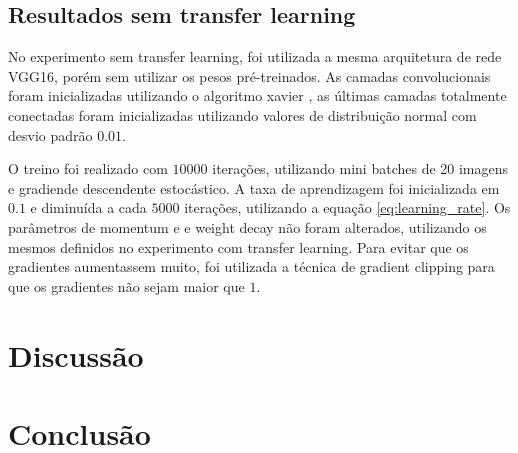 \documentclass[conference]{IEEEtran}
\begin{document}
  \subsection{Resultados sem transfer learning}

  No experimento sem transfer learning, foi utilizada a mesma arquitetura de rede VGG16, porém sem utilizar os pesos pré-treinados. As camadas convolucionais foram inicializadas utilizando o algoritmo xavier \cite{xavier2010}, as últimas camadas totalmente conectadas foram inicializadas utilizando valores de distribuição normal com desvio padrão $0.01$.

  O treino foi realizado com $10000$ iterações, utilizando mini batches de 20 imagens e gradiende descendente estocástico. A taxa de aprendizagem foi inicializada em $0.1$ e diminuída a cada $5000$ iterações, utilizando a equação \ref{eq:learning_rate}. Os parâmetros de momentum e e weight decay não foram alterados, utilizando os mesmos definidos no experimento com transfer learning. Para evitar que os gradientes aumentassem muito, foi utilizada a técnica de gradient clipping para que os gradientes não sejam maior que $1$.


\section{Discussão}




\section{Conclusão}






\end{document}
